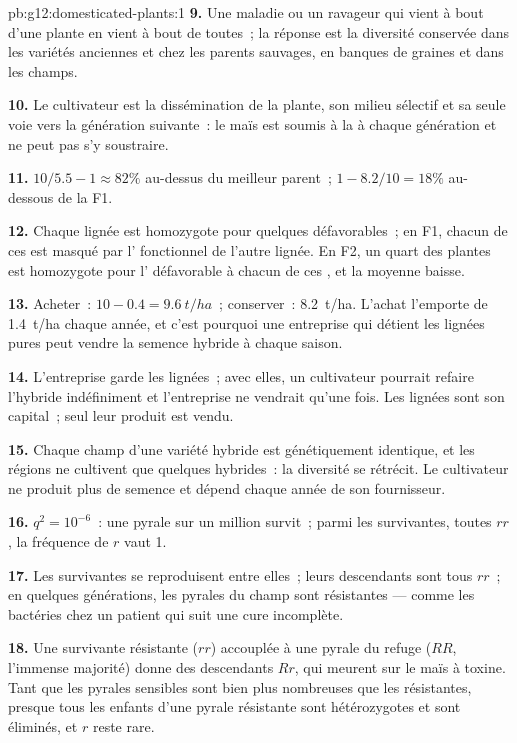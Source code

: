 \begin{solution}{pb:g12:domesticated-plants:1}
\textbf{9.} Une maladie ou un ravageur qui vient à bout d'une plante
en vient à bout de toutes~; la réponse est la diversité conservée dans
les variétés anciennes et chez les parents sauvages, en banques de
graines et dans les champs.

\textbf{10.} Le cultivateur est la dissémination de la plante, son
milieu sélectif et sa seule voie vers la génération suivante~: le maïs
est soumis à la  à chaque génération et ne peut
pas s'y soustraire.

\textbf{11.} $10/5.5 - 1 \approx 82\%$ au-dessus du meilleur parent~;
$1 - 8.2/10 = 18\%$ au-dessous de la F1.

\textbf{12.} Chaque lignée est homozygote pour quelques 
 défavorables~; en F1, chacun de ces  est masqué par
l' fonctionnel de l'autre lignée. En F2, un quart des plantes
est homozygote pour l' défavorable à chacun de ces , et la
moyenne baisse.

\textbf{13.} Acheter~: $10 - 0.4 = \qty{9.6}{t/ha}$~; conserver~:
\qty{8.2}{t/ha}. L'achat l'emporte de \qty{1.4}{t/ha} chaque année, et
c'est pourquoi une entreprise qui détient les lignées pures peut
vendre la semence hybride à chaque saison.

\textbf{14.} L'entreprise garde les lignées~; avec elles, un
cultivateur pourrait refaire l'hybride indéfiniment et l'entreprise ne
vendrait qu'une fois. Les lignées sont son capital~; seul leur produit
est vendu.

\textbf{15.} Chaque champ d'une variété hybride est génétiquement
identique, et les régions ne cultivent que quelques hybrides~: la
diversité se rétrécit. Le cultivateur ne produit plus de semence et
dépend chaque année de son fournisseur.

\textbf{16.} $q^2 = 10^{-6}$~: une pyrale sur un million survit~;
parmi les survivantes, toutes $rr$, la fréquence de $r$ vaut 1.

\textbf{17.} Les survivantes se reproduisent entre elles~; leurs
descendants sont tous $rr$~; en quelques générations, les pyrales du
champ sont résistantes --- comme les bactéries chez un patient qui
suit une cure incomplète.

\textbf{18.} Une survivante résistante ($rr$) accouplée à une pyrale
du refuge ($RR$, l'immense majorité) donne des descendants $Rr$, qui
meurent sur le maïs à toxine. Tant que les pyrales sensibles sont bien
plus nombreuses que les résistantes, presque tous les enfants d'une
pyrale résistante sont hétérozygotes et sont éliminés, et $r$ reste
rare.


\end{solution}
